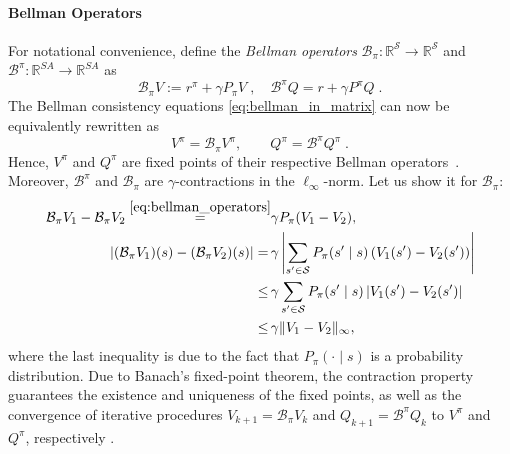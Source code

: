 \documentclass{article}
\numberwithin{equation}{section}
\newcommand{\eqsp}{\;}
\def\rp{r^\pi}
\begin{document}
\paragraph{Bellman Operators}  
For notational convenience, define the \emph{Bellman operators} \(\mathcal{B}_\pi: \mathbb{R}^{\mathcal{S}} \to \mathbb{R}^{\mathcal{S}}\) and \(\mathcal{B}^\pi: \mathbb{R}^{SA} \to \mathbb{R}^{SA}\) as  
\begin{equation}
\label{eq:bellman_operators}
\mathcal{B}_\pi V := \rp+ \gamma  P_\pi V\eqsp,\quad  \mathcal{B}^\pi Q  =r + \gamma P^\pi Q\eqsp. 
\end{equation}
The Bellman consistency equations \eqref{eq:bellman_in_matrix} can now be equivalently rewritten as  
\begin{equation}
V^\pi = \mathcal{B}_\pi V^\pi, \qquad Q^\pi = \mathcal{B}^\pi Q^\pi \eqsp.
\end{equation}
Hence, \(V^\pi\) and \(Q^\pi\) are fixed points of their respective Bellman operators~\cite{putermanMDP}.
Moreover, \(\mathcal{B}^\pi\) and \(\mathcal{B}_\pi\) are \(\gamma\)-contractions in the \(\ell_\infty\)-norm. Let us show it for \(\mathcal{B}_\pi\):
\begin{align*}
    \mathcal B_\pi V_1 - \mathcal B_\pi V_2
   \stackrel{\eqref{eq:bellman_operators}}{=}& \gamma P_\pi (V_1 - V_2), \\
    |(\mathcal B_\pi V_1)(s) - (\mathcal B_\pi V_2)(s)|
    =\, & \gamma \left| \sum_{s' \in \mathcal S}
        P_\pi(s' \mid s)\,(V_1(s') - V_2(s'))
      \right| \\
      \le\, & \gamma \sum_{s' \in \mathcal S}
        P_\pi(s' \mid s)\,
        |V_1(s') - V_2(s')| \\
    \le\, & \gamma \|V_1 - V_2\|_\infty,
\end{align*}
where the last inequality is due to the fact that $P_\pi(\cdot \mid s)$ is a probability distribution. Due to Banach's fixed-point theorem, the contraction property guarantees the existence and uniqueness of the fixed points, as well as the convergence of iterative procedures \(V_{k+1} = \mathcal{B}_\pi V_k\) and \(Q_{k+1} = \mathcal{B}^\pi Q_k\) to \(V^\pi\) and \(Q^\pi\), respectively \cite[Theorem 6.2.3]{putermanMDP}.
\end{document}
